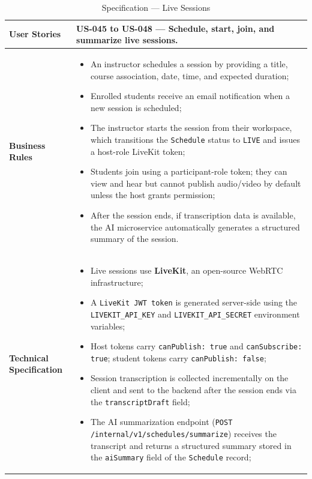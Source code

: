 \begin{table}[H]
\centering
\caption{Specification — Live Sessions}
\label{tab:livekit_spec}
\renewcommand{\arraystretch}{1.2}
\begin{tabularx}{\textwidth}{|p{3.5cm}|X|}
\hline
\textbf{User Stories} & US-045 to US-048 — Schedule, start, join, and summarize live sessions. \\
\hline
\textbf{Business Rules} &
\begin{itemize}[noitemsep, topsep=2pt]
  \item An instructor schedules a session by providing a title, course association,
        date, time, and expected duration;
  \item Enrolled students receive an email notification when a new session is scheduled;
  \item The instructor starts the session from their workspace, which transitions the
        \texttt{Schedule} status to \texttt{LIVE} and issues a host-role LiveKit token;
  \item Students join using a participant-role token; they can view and hear but cannot
        publish audio/video by default unless the host grants permission;
  \item After the session ends, if transcription data is available, the AI microservice
        automatically generates a structured summary of the session.
\end{itemize} \\
\hline
\textbf{Technical Specification} &
\begin{itemize}[noitemsep, topsep=2pt]
  \item Live sessions use \textbf{LiveKit}, an open-source WebRTC infrastructure;
  \item A \texttt{LiveKit JWT token} is generated server-side using the
        \texttt{LIVEKIT\_API\_KEY} and \texttt{LIVEKIT\_API\_SECRET} environment
        variables;
  \item Host tokens carry \texttt{canPublish: true} and \texttt{canSubscribe: true};
        student tokens carry \texttt{canPublish: false};
  \item Session transcription is collected incrementally on the client and sent to the
        backend after the session ends via the \texttt{transcriptDraft} field;
  \item The AI summarization endpoint (\texttt{POST /internal/v1/schedules/summarize})
        receives the transcript and returns a structured summary stored in the
        \texttt{aiSummary} field of the \texttt{Schedule} record;

\end{itemize}
\end{tabularx}
\end{table}
